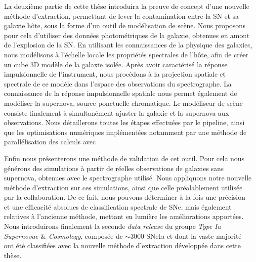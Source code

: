 \documentclass[../main/main.tex]{subfiles}
\begin{document}
La deuxième partie de cette thèse introduira la preuve de concept d'une
nouvelle méthode d'extraction, permettant de lever la contamination
entre la SN et sa galaxie hôte, sous la forme d'un outil de modélisation
de scène. Nous proposons pour cela d'utiliser des
données photométriques de la galaxie, obtenues en amont de l'explosion de
la SN. En utilisant les connaissances de la physique
des galaxies, nous modélisons à l’échelle locale les propriétés
spectrales de l'hôte, afin de créer un cube 3D modèle de la galaxie
isolée. Après avoir
caractérisé la réponse impulsionnelle de l'instrument, nous procédons à la projection spatiale et spectrale de ce modèle
dans l'espace des observations du spectrographe. La connaissance de la
réponse impulsionnelle spatiale nous
permet également de modéliser la
supernova, source ponctuelle chromatique. Le modéliseur de scène
consiste finalement à simultanément ajuster la
galaxie et la supernova aux observations. Nous détaillerons toutes les
étapes effectuées par le pipeline, ainsi que les optimisations
numériques implémentées notamment par une méthode de parallélisation des
calculs avec .

Enfin nous présenterons une méthode de validation de cet outil. Pour
cela nous générons des simulations à partir de réelles observations de
galaxies sans supernova, obtenues avec le spectrographe utilisé. Nous
appliquons notre nouvelle méthode d'extraction sur ces simulations,
ainsi que celle préalablement utilisée par la collaboration. De ce fait,
nous pouvons déterminer à la fois une précision et une efficacité
absolues de classification spectrale de SNe, mais également relatives à
l'ancienne méthode, mettant en lumière les améliorations apportées. Nous
introduirons finalement la seconde \textit{data release} du groupe
\textit{Type Ia Supernovae $\&$ Cosmology}, composée de $\sim3000$ SNeIa et dont la vaste majorité ont
été classifiées avec la nouvelle méthode d’extraction développée dans
cette thèse.
\end{document}
